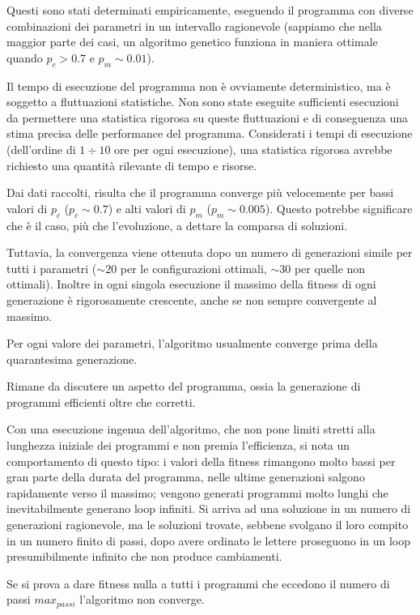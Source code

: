 \documentclass[paper=a4, fontsize=11pt]{scrartcl}
\numberwithin{equation}{section}		%
\numberwithin{figure}{section}			%
\numberwithin{table}{section}				%
\begin{document}
Questi sono stati determinati empiricamente, eseguendo il programma con diverse combinazioni dei parametri in un intervallo ragionevole (sappiamo che nella maggior parte dei casi, un algoritmo genetico funziona in maniera ottimale quando $p_c  > 0.7$ e $p_m \sim 0.01$).

Il tempo di esecuzione del programma non è ovviamente deterministico, ma è soggetto a fluttuazioni statistiche. Non sono state eseguite sufficienti esecuzioni da permettere una statistica rigorosa su queste fluttuazioni e di conseguenza una stima precisa delle performance del programma. Considerati i tempi di esecuzione (dell'ordine di $1 \div 10$ ore per ogni esecuzione), una statistica rigorosa  avrebbe richiesto una quantità rilevante di tempo e risorse.

Dai dati raccolti, risulta che il programma converge più velocemente per bassi valori di $p_c$ ($p_c \sim 0.7$) e alti valori di $p_m$ ($p_m \sim 0.005$). Questo potrebbe significare che è il caso, più che l'evoluzione, a dettare la comparsa di soluzioni. 

Tuttavia, la convergenza  viene ottenuta dopo un numero di generazioni simile per tutti i parametri ($ \sim 20$ per le configurazioni ottimali, $\sim 30$ per quelle non ottimali). Inoltre in ogni singola esecuzione il massimo della fitness di ogni generazione è rigorosamente crescente, anche se non sempre convergente al massimo.


Per ogni valore dei parametri, l'algoritmo usualmente converge prima della quarantesima generazione. 

Rimane da discutere un aspetto del programma, ossia la generazione di programmi efficienti oltre che corretti.

Con una esecuzione ingenua dell'algoritmo, che non pone limiti stretti alla lunghezza iniziale dei programmi e non premia l'efficienza,  si nota un comportamento di questo tipo:
i valori della fitness rimangono molto bassi per gran parte della durata del programma, nelle ultime generazioni salgono rapidamente verso il massimo; vengono generati programmi molto lunghi che inevitabilmente generano loop infiniti. Si arriva ad una soluzione in un numero di generazioni ragionevole, ma le soluzioni trovate, sebbene svolgano il loro compito in un numero finito di passi, dopo avere ordinato le lettere proseguono in un loop presumibilmente infinito che non produce cambiamenti.

Se si prova a dare fitness nulla a tutti i programmi che eccedono il numero di passi $max_{passi}$ l'algoritmo non converge.
\end{document}
